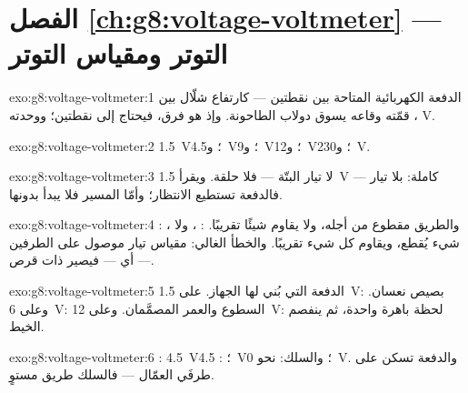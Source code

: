 \section*{الفصل \ref{ch:g8:voltage-voltmeter} --- التوتر ومقياس التوتر}

\begin{solution}{exo:g8:voltage-voltmeter:1}
الدفعة الكهربائية المتاحة بين نقطتين --- كارتفاع شلّال بين
قمّته وقاعه يسوق دولاب الطاحونة. وإذ هو فرق، فيحتاج إلى
نقطتين؛ ووحدته ، \unit{V}.
\end{solution}

\begin{solution}{exo:g8:voltage-voltmeter:2}
\qty{1.5}{V}؛ و\qty{4.5}{V}؛ و\qty{9}{V}؛ و\qty{12}{V}؛
و\qty{230}{V}.
\end{solution}

\begin{solution}{exo:g8:voltage-voltmeter:3}
لا تيار البتّة --- فلا حلقة. ويقرأ  \qty{1.5}{V}
كاملة:  بلا تيار --- فالدفعة تستطيع الانتظار؛ وأمّا المسير
فلا يبدأ بدونها.
\end{solution}

\begin{solution}{exo:g8:voltage-voltmeter:4}
: ، والطريق مقطوع من أجله، ولا يقاوم
شيئًا تقريبًا. : ، ولا شيء يُقطع،
ويقاوم كل شيء تقريبًا. والخطأ الغالي: مقياس تيار موصول على
الطرفين --- أي  --- فيصير  ذات قرص.
\end{solution}

\begin{solution}{exo:g8:voltage-voltmeter:5}
الدفعة التي بُني لها الجهاز. على \qty{1.5}{V}: بصيص نعسان.
وعلى \qty{6}{V}: السطوع والعمر المصمَّمان. وعلى \qty{12}{V}:
لحظة باهرة واحدة، ثم ينفصم الخيط.
\end{solution}

\begin{solution}{exo:g8:voltage-voltmeter:6}
: \qty{4.5}{V}؛ : \qty{4.5}{V}؛ والسلك: نحو
\qty{0}{V}. والدفعة تسكن على طرفَي العمّال --- فالسلك طريق
مستوٍ.
\end{solution}

